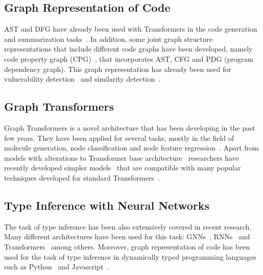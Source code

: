 \subsection{Graph Representation of Code}\label{subsec:graph-representation-of-code}

AST and DFG have already been used with Transformers in the code generation and summarization tasks~\cite{wang_unified_2022,tang_ast-transformer_2021,sun_treegen_2020}.
In addition, some joint graph structure representations that include different code graphs have been developed,
namely code property graph (CPG)~\cite{yamaguchi2014modeling}, that incorporates AST, CFG and PDG (program dependency graph).
This graph representation has already been used for vulnerability detection~\cite{yamaguchi2014modeling} and similarity detection~\cite{liu2023learning}.

\subsection{Graph Transformers}\label{subsec:graph-transformers}

Graph Transformers is a novel architecture that has been developing in the past few years.
They have been applied for several tasks, mostly in the field of molecule generation, node classification and node feature regression~\cite{kim_pure_2022,kreuzer_rethinking_2021,dwivedi_generalization_2021,ying_transformers_2021}.
Apart from models with alterations to Transformer base architecture~\cite{ying_transformers_2021, kreuzer_rethinking_2021}
researchers have recently developed simpler models~\cite{kim_pure_2022} that are compatible with many popular techniques developed for
standard Transformers~\cite{choromanski_rethinking_2020}.

\subsection{Type Inference with Neural Networks}\label{subsec:type-inference-with-neural-networks}

The task of type inference has been also extensively covered in recent research.
Many different architectures have been used for this task: GNNs~\cite{allamanis2020typilus}, RNNs~\cite{pradel2020typewriter, mir_type4py_2021} and Transformers~\cite{jesse2021typebert, peng2023generative} among others.
Moreover, graph representation of code has been used for the task of type inference in dynamically typed programming languages such as Python~\cite{allamanis2020typilus} and Javascript~\cite{schrouff_inferring_2019}.

